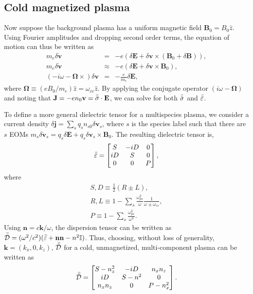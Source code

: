 	\subsection{Cold magnetized plasma}

	Now suppose the background plasma has a uniform magnetic field $\mathbf{B}_0=B_0\hat{z}$. Using Fourier amplitudes and dropping second order terms, the equation of motion can thus be written as 
	\begin{eqnarray}
		\label{eq:cmp_eom}
		m_e\delta\dot{\mathbf{v}} &=& -e(\delta\mathbf{E} + \delta\mathbf{v}\times(\mathbf{B}_0+\delta\mathbf{B})), \\ 
		m_e\delta\dot{\mathbf{v}} &\approx& -e(\delta\mathbf{E} + \delta\mathbf{v}\times\mathbf{B}_0), \\
		(-i\omega - \mathbf{\Omega}\times)\delta\mathbf{v} &=& -\frac{e}{m_e}\delta\mathbf{E},
	\end{eqnarray}
	where $\mathbf{\Omega}\equiv (eB_0/m_e)\hat{z}=\omega_{ce}\hat{z}$. By applying the conjugate operator $(i\omega-\mathbf{\Omega})$ and noting that $\mathbf{J}=-en_0\mathbf{v}=\bar{\bar{\sigma}}\cdot\mathbf{E}$, we can solve for both $\bar{\bar{\sigma}}$ and $\bar{\bar{\varepsilon}}$. 

	To define a more general dielectric tensor for a multispecies plasma, we consider a current density $\delta\mathbf{j}=\sum_sq_sn_{s0}\delta\mathbf{v}_s$, where $s$ is the species label such that there are $s$ EOMs $m_s\delta\dot{\mathbf{v}}_s = q_s\delta\mathbf{E} + q_s\delta\mathbf{v}_s\times \mathbf{B}_0$. The resulting dielectric tensor is,
	\begin{equation}
		\bar{\bar{\varepsilon}} = 
		\begin{bmatrix}
			S & -iD & 0\\
			iD & S & 0\\
			0 & 0 & P
		\end{bmatrix}
		,
	\end{equation}
	where
	\begin{align}
		S,D \equiv \frac{1}{2}(R\pm L),\label{eq:sd_mode}\\
		R,L \equiv 1 - \sum_s\frac{\omega_{ps}^2}{\omega}\frac{1}{\omega\pm\omega_{cs}},\label{eq:rl_mode}\\
		P \equiv 1 - \sum_s\frac{\omega_{ps}^2}{\omega^2}.\label{eq:p_mode}
	\end{align}
	Using $\mathbf{n}= c\mathbf{k}/\omega$, the dispersion tensor can be written as $\bar{\bar{\mathcal{D}}}=(\omega^2/c^2)(\bar{\bar{\varepsilon}} + \mathbf{nn} - n^2\mathbb{I})$. Thus, choosing, without loss of generality, $\mathbf{k}=(k_x,0,k_z)$, $\bar{\bar{\mathcal{D}}}$ for a cold, unmagnetized, multi-component plasma can be written as
	\begin{equation}
		\label{eq:dt_mp}
		\bar{\bar{\mathcal{D}}} = 
		\begin{bmatrix}
			S - n_z^2 & -iD & n_xn_z \\ 
			iD & S-n^2 & 0 \\
			n_xn_z & 0 & P-n_x^2
		\end{bmatrix}
		.
	\end{equation}

